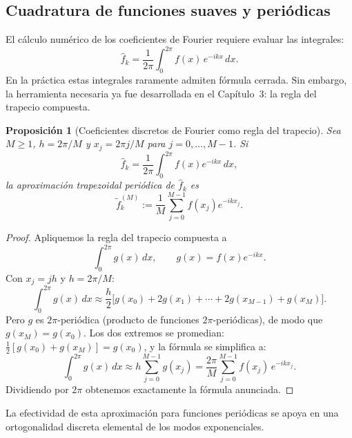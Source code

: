 \documentclass[a4paper,11pt]{report}
\newtheorem{proposition}[theorem]{Proposición}
\begin{document}
\subsection{Cuadratura de funciones suaves y periódicas}

El cálculo numérico de los coeficientes de Fourier requiere evaluar las integrales:
\[
\hat{f}_k = \frac{1}{2\pi} \int_0^{2\pi} f(x)\, e^{-ikx}\, dx.
\]
En la práctica estas integrales raramente admiten fórmula cerrada.  Sin embargo, la herramienta necesaria ya fue desarrollada en el Capítulo~3: la regla del trapecio compuesta.

\begin{proposition}[Coeficientes discretos de Fourier como regla del trapecio]\label{prop:coef_discretos_trap}
Sea $M\ge 1$, $h=2\pi/M$ y $x_j=2\pi j/M$ para $j=0,\ldots,M-1$. Si
\[
\hat f_k = \frac{1}{2\pi}\int_0^{2\pi} f(x)e^{-ikx}\,dx,
\]
la aproximación trapezoidal periódica de $\hat f_k$ es
\[
\tilde f_k^{(M)} := \frac{1}{M}\sum_{j=0}^{M-1} f(x_j)e^{-ikx_j}.
\]
\end{proposition}

\begin{proof}
Apliquemos la regla del trapecio compuesta a
\[
\int_0^{2\pi} g(x)\,dx,\qquad g(x)=f(x)e^{-ikx}.
\]
Con $x_j=jh$ y $h=2\pi/M$:
\[
\int_0^{2\pi} g(x)\,dx \approx \frac{h}{2}\big[g(x_0) + 2g(x_1) + \cdots + 2g(x_{M-1}) + g(x_M)\big].
\]
Pero $g$ es $2\pi$-periódica (producto de funciones $2\pi$-periódicas), de modo que $g(x_M) = g(x_0)$.  Los dos extremos se promedian: $\frac{1}{2}[g(x_0) + g(x_M)] = g(x_0)$, y la fórmula se simplifica a:
\[
\int_0^{2\pi} g(x)\,dx \approx h \sum_{j=0}^{M-1} g(x_j) = \frac{2\pi}{M}\sum_{j=0}^{M-1} f(x_j)\,e^{-ikx_j}.
\]
Dividiendo por $2\pi$ obtenemos exactamente la fórmula anunciada.
\end{proof}

La efectividad de esta aproximación para funciones periódicas se apoya en una ortogonalidad discreta elemental de los modos exponenciales. 
\end{document}
